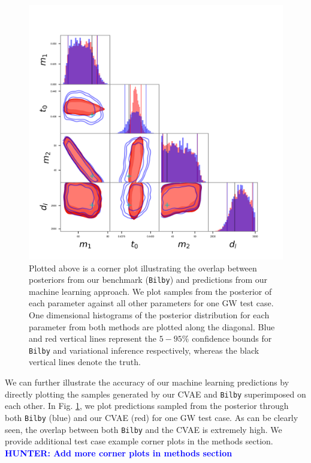 \documentclass[%
showpacs,
 amsmath,amssymb,
 aps,
 twocolumn,
 prl,
 reprint,
floatfix,
]{revtex4-1}
\newcommand{\chris}[1]{\textbf{\textcolor{red}{CHRIS: #1}}}
\newcommand{\hunter}[1]{\textbf{\textcolor{blue}{HUNTER: #1}}}
\begin{document}
%
%
\begin{figure}
    \includegraphics[width=\columnwidth]{images/corner_testcase0.png}
    \caption{\label{fig:corner_plot} Plotted above is a corner plot illustrating the 
    overlap between posteriors from our benchmark (\texttt{Bilby}) and predictions 
    from our machine learning approach. We plot samples from the posterior of each 
    parameter against all other parameters for one \ac{GW} test case. One dimensional 
    histograms of the posterior distribution for each parameter from both methods 
    are plotted along the diagonal. Blue and red vertical lines represent the 
    $5 - 95\%$ confidence bounds for \texttt{Bilby} and variational inference respectively, 
    whereas the black vertical lines denote the truth.}
\end{figure}
%
%
%
We can further illustrate the accuracy of our machine learning predictions by
directly plotting the samples generated by our CVAE and \texttt{Bilby}
superimposed on each other.  In Fig. \ref{fig:corner_plot}, we plot
predictions sampled from the posterior through both \texttt{Bilby} (blue) and
our CVAE (red) for one \ac{GW} test case.  As can be clearly seen, the overlap between both
\texttt{Bilby} and the \ac{CVAE} is extremely high. We provide additional test case example 
corner plots in the methods section. \hunter{Add more corner plots in methods section}
\end{document}
